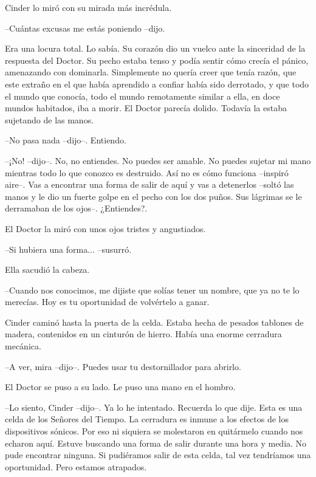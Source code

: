 Cinder lo miró con su mirada más incrédula.



--Cuántas excusas me estás poniendo --dijo.



Era una locura total. Lo sabía. Su corazón dio un vuelco ante la sinceridad de la respuesta del Doctor. Su pecho estaba tenso y podía sentir cómo crecía el pánico, amenazando con dominarla. Simplemente no quería creer que tenía razón, que este extraño en el que había aprendido a confiar había sido derrotado, y que todo el mundo que conocía, todo el mundo remotamente similar a ella, en doce mundos habitados, iba a morir. El Doctor parecía dolido. Todavía la estaba sujetando de las manos.



--No pasa nada --dijo--. Entiendo.



--¡No! --dijo--. No, no entiendes. No puedes ser amable. No puedes sujetar mi mano mientras todo lo que conozco es destruido. Así no es cómo funciona --inspiró aire--. Vas a encontrar una forma de salir de aquí y vas a detenerlos --soltó las manos y le dio un fuerte golpe en el pecho con los dos puños. Sus lágrimas se le derramaban de los ojos--. ¿Entiendes?.



El Doctor la miró con unos ojos tristes y angustiados.



--Si hubiera una forma... --susurró.



Ella sacudió la cabeza.



--Cuando nos conocimos, me dijiste que solías tener un nombre, que ya no te lo merecías. Hoy es tu oportunidad de volvértelo a ganar.



Cinder caminó hasta la puerta de la celda. Estaba hecha de pesados tablones de madera, contenidos en un cinturón de hierro. Había una enorme cerradura mecánica.



--A ver, mira --dijo--. Puedes usar tu destornillador para abrirlo.



El Doctor se puso a su lado. Le puso una mano en el hombro.



--Lo siento, Cinder --dijo--. Ya lo he intentado. Recuerda lo que dije. Esta es una celda de los Señores del Tiempo. La cerradura es inmune a los efectos de los dispositivos sónicos. Por eso ni siquiera se molestaron en quitármelo cuando nos echaron aquí. Estuve buscando una forma de salir durante una hora y media. No pude encontrar ninguna. Si pudiéramos salir de esta celda, tal vez tendríamos una oportunidad. Pero estamos atrapados.



